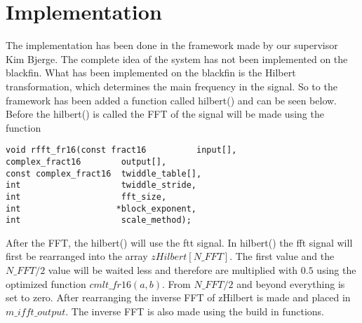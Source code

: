 
\section{Implementation}
\label{sec:impl}
The implementation has been done in the framework made by our supervisor Kim Bjerge. The complete idea of the system has not been implemented on the blackfin. What has been implemented on the blackfin is the Hilbert transformation, which determines the main frequency in the signal. So to the framework has been added a function called hilbert() and can be seen below. Before the hilbert() is called the FFT of the signal will be made using the function 
\begin{verbatim}
void rfft_fr16(const fract16          input[],
complex_fract16        output[],
const complex_fract16  twiddle_table[],
int                    twiddle_stride,
int                    fft_size,
int                   *block_exponent,
int                    scale_method);
\end{verbatim}
After the FFT, the hilbert() will use the ftt signal. In hilbert() the fft signal will first be rearranged into the array $zHilbert[N\_FFT]$. The first value and the $N\_FFT/2$ value will be waited less and therefore are multiplied with $0.5$ using the optimized function $cmlt\_fr16(a,b)$. From $N\_FFT/2$ and beyond everything is set to zero. 
After rearranging the inverse FFT of zHilbert is made and placed in $m\_ifft\_output$. The inverse FFT is also made using the build in functions.
